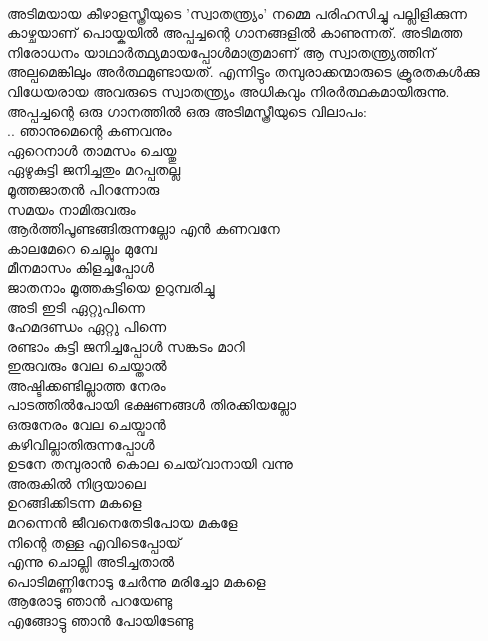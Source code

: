 \label{ch2box8} %
\begin{tcolorbox}[%
 breakable, %
  arc=0mm, 
  left=1pt, right = 1pt, 
  boxrule=0mm,
  colback = {blue!10}, %
] 

\paragraph{}
അടിമയായ കീഴാളസ്ത്രീയുടെ 'സ്വാതന്ത്ര്യം' നമ്മെ പരിഹസിച്ചു പല്ലിളിക്കുന്ന കാഴ്ചയാണ് പൊയ്കയിൽ അപ്പച്ചന്റെ ഗാനങ്ങളിൽ കാണുന്നത്. അടിമത്ത നിരോധനം യാഥാർത്ഥ്യമായപ്പോൾമാത്രമാണ് ആ സ്വാതന്ത്ര്യത്തിന് അല്പമെങ്കിലും അർത്ഥമുണ്ടായത്. എന്നിട്ടും തമ്പുരാക്കന്മാരുടെ ക്രൂരതകൾക്കു വിധേയരായ അവരുടെ സ്വാതന്ത്ര്യം അധികവും നിരർത്ഥകമായിരുന്നു. അപ്പച്ചന്റെ ഒരു ഗാനത്തിൽ ഒരു അടിമസ്ത്രീയുടെ വിലാപം:\\
.. ഞാനുമെന്റെ കണവനും\\
ഏറെനാൾ താമസം ചെയ്തു\\
ഏഴുകുട്ടി ജനിച്ചതും മറപ്പതല്ല\\
മൂത്തജാതൻ പിറന്നോരു\\
സമയം നാമിരുവരും\\
ആർത്തിപൂണ്ടങ്ങിരുന്നല്ലോ എൻ കണവനേ\\
കാലമേറെ ചെല്ലും മുമ്പേ\\
മീനമാസം കിളച്ചപ്പോൾ\\
ജാതനാം മൂത്തകുട്ടിയെ ഉറുമ്പരിച്ചു\\
അടി ഇടി ഏറ്റുപിന്നെ\\
ഹേമദണ്ഡം ഏറ്റു പിന്നെ\\
രണ്ടാം കുട്ടി ജനിച്ചപ്പോൾ സങ്കടം മാറി\\
ഇരുവരും വേല ചെയ്താൽ\\
അഷ്ടിക്കണ്ടില്ലാത്ത നേരം\\
പാടത്തിൽപോയി ഭക്ഷണങ്ങൾ തിരക്കിയല്ലോ\\
ഒരുനേരം വേല ചെയ്വാൻ\\
കഴിവില്ലാതിരുന്നപ്പോൾ\\
ഉടനേ തമ്പുരാൻ കൊല ചെയ്‌വാനായി വന്നു\\
അരുകിൽ നിദ്രയാലെ\\
ഉറങ്ങിക്കിടന്ന മകളെ\\
മറന്നെൻ ജീവനെതേടിപോയ മകളേ\\
നിന്റെ തള്ള എവിടെപ്പോയ്\\
എന്നു ചൊല്ലി അടിച്ചതാൽ\\
പൊടിമണ്ണിനോടു ചേർന്നു മരിച്ചോ മകളെ\\
ആരോടു ഞാൻ പറയേണ്ടു\\
എങ്ങോട്ടു ഞാൻ പോയിടേണ്ടു\\

\end{tcolorbox}
